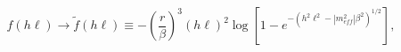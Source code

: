 \begin{equation}
f\left(h\ell \right)\rightarrow \widetilde{f}\left(h\ell \right)\equiv -\left(\frac{r}{\beta }\right)^{3}\left(h\ell \right)^{2}\log \left[1-e^{-\left(h^{2}\ell ^{2}-\left|m_{eff}^{2}\right|\beta ^{2}\right)^{1/2}}\right],\end{equation}

